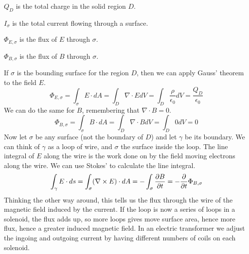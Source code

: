 \documentclass[fleqn,letterpaper]{report}
\begin{document}
\begin{smallitemize}
\item $Q_D$ is the total charge in the solid region $D$.
\item $I_\sigma$ is the total current flowing through a
surface.
\item $\Phi_{E,\sigma}$ is the flux of $E$ through $\sigma$. 
\item $\Phi_{B,\sigma}$ is the flux of $B$ through $\sigma$. 
\end{smallitemize}

If $\sigma$ is the bounding surface for the region $D$, then
we can apply Gauss' theorem to the field $E$. 
\begin{equation*}
\Phi_{E,\sigma} = \int_\sigma E \cdot dA = \int_D \nabla
\cdot E dV = \int_D \frac{\rho}{\epsilon_0} dV =
\frac{Q_D}{\epsilon_0}
\end{equation*}
We can do the same for $B$, remembering that $\nabla \cdot B
= 0$.
\begin{equation*}
\Phi_{B,\sigma} = \int_\sigma B \cdot dA = \int_D \nabla
\cdot B dV = \int_D 0 dV = 0
\end{equation*}
Now let $\sigma$ be any surface (not the boundary of $D$) and
let $\gamma$ be its boundary. We can think of $\gamma$ as a
loop of wire, and $\sigma$ the surface inside the loop. 
The line integral of $E$ along the wire is the work done on
by the field moving electrons along the wire. We can use
Stokes' to calculate the line integral.
\begin{equation*}
\int_\gamma E \cdot ds = \int_{\sigma} (\nabla \times E) \cdot
dA = - \int_\sigma \frac{\partial B}{\partial t} = -\frac{\partial}{\partial
t} \Phi_{B,\sigma}
\end{equation*}
Thinking the other way around, this tells us the flux through
the wire of the magnetic field induced by the current. If the
loop is now a series of loops in a solenoid, the flux adds up,
so more loops gives move surface area, hence more flux, hence a
greater induced magnetic field. In an electric transformer
we adjust the ingoing and outgoing current by having different
numbers of coils on each solenoid.
\end{document}
